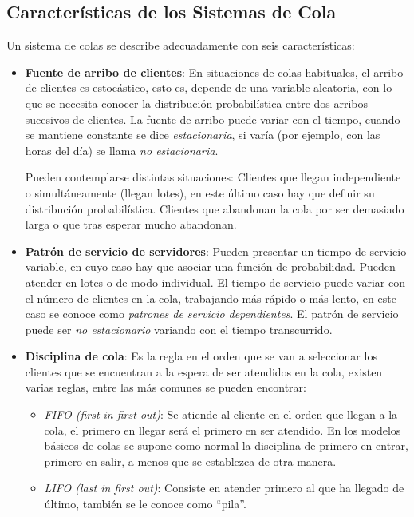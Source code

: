\documentclass{article}
\begin{document}
\subsection{Características de los Sistemas de Cola}
Un sistema de colas se describe adecuadamente con seis características:
\begin{itemize}
    \item \textbf{Fuente de arribo de clientes}:  En situaciones de colas habituales, el arribo de clientes es estocástico, esto es, depende de una variable aleatoria, con lo que se necesita conocer la distribución probabilística entre dos arribos sucesivos de clientes. La fuente de arribo puede variar con el tiempo, cuando se mantiene constante se dice \textit{estacionaria}, si varía (por ejemplo, con las horas del día) se llama \textit{no estacionaria}.

    Pueden contemplarse distintas situaciones: Clientes que llegan independiente o simultáneamente (llegan lotes), en este último caso hay que definir su distribución probabilística.  Clientes que abandonan la cola por ser demasiado larga o que tras esperar mucho abandonan.
    
    \item \textbf{Patrón de servicio de servidores}: Pueden presentar un tiempo de servicio variable, en cuyo caso hay que asociar una función de probabilidad. Pueden atender en lotes o de modo individual. El tiempo de servicio puede variar con el número de clientes en la cola, trabajando más rápido o más lento, en este caso se conoce como \textit{patrones de servicio dependientes}. El patrón de servicio puede ser \textit{no estacionario} variando con el tiempo transcurrido.
    
    \item \textbf{Disciplina de cola}: Es la regla en el orden que se van a seleccionar los clientes que se encuentran a la espera de ser atendidos en la cola, existen varias reglas, entre las más comunes se pueden encontrar:
        \begin{itemize}
            \item \textit{FIFO (first in first out)}: Se atiende al cliente en el orden que llegan a la cola, el primero en llegar será el primero en ser atendido. En los modelos básicos de colas se supone como normal la disciplina de primero en entrar, primero en salir, a menos que se establezca de otra manera.

            \item  \textit{LIFO (last in first out)}: Consiste en atender primero al que ha llegado de último, también se le conoce como ``pila''.


\end{itemize}
\end{itemize}
\end{document}
